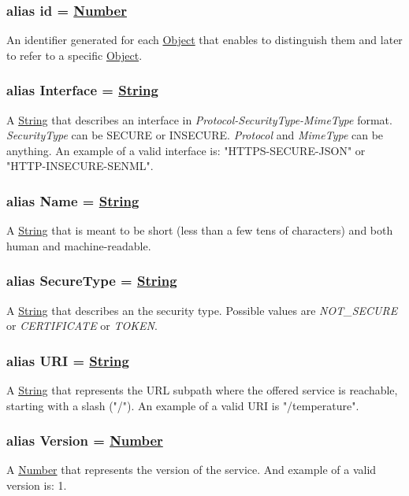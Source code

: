 \documentclass[a4paper]{arrowhead}
\newcommand{\pdef}[1]{{\textcolor{ArrowheadGrey}{#1 \label{sec:model:primitives:#1} \label{sec:model:primitives:#1s}}}}
\newcommand{\pref}[1]{{\textcolor{ArrowheadGrey}{\hyperref[sec:model:primitives:#1]{#1}}}}
\begin{document}
\subsubsection{alias \pdef{id} = \pref{Number}}

An identifier generated for each \pref{Object} that enables to distinguish them and later to refer to a specific \pref{Object}.

\subsubsection{alias \pdef{Interface} = \pref{String}}

A \pref{String} that describes an interface in \textit{Protocol-SecurityType-MimeType} format. \textit{SecurityType} can be SECURE or INSECURE. \textit{Protocol} and \textit{MimeType} can be anything. An example of a valid interface is: "HTTPS-SECURE-JSON" or "HTTP-INSECURE-SENML".

\subsubsection{alias \pdef{Name} = \pref{String}}

A \pref{String} that is meant to be short (less than a few tens of characters) and both human and machine-readable.

\subsubsection{alias \pdef{SecureType} = \pref{String}}

A \pref{String} that describes an the security type. Possible values are \textit{NOT\_SECURE} or \textit{CERTIFICATE} or \textit{TOKEN}.

\subsubsection{alias \pdef{URI} = \pref{String}}

A \pref{String} that represents the URL subpath where the offered service is reachable, starting with a slash ("/"). An example of a valid URI is "/temperature".

\subsubsection{alias \pdef{Version} = \pref{Number}}

A \pref{Number} that represents the version of the service. And example of a valid version is: 1.
\color{black}
\end{document}
